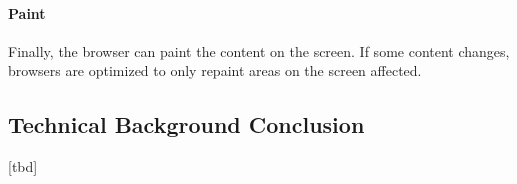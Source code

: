 

\paragraph{Paint}

Finally, the browser can paint the content on the screen.
If some content changes, browsers are optimized to only repaint areas on the screen affected.  %



















\subsection{Technical Background Conclusion}

[tbd]







